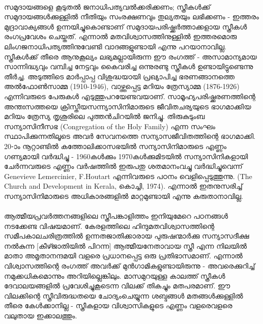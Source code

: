 \label{ch4box2} %
\begin{tcolorbox}[%
 breakable, %
  arc=0mm, 
  left=1pt, right = 1pt, 
  boxrule=0mm,
  colback = {blue!10}, %
] 
\paragraph{}

സമുദായങ്ങളെ കൂടുതൽ ജനാധിപത്യവൽക്കരിക്കണം; സ്ത്രീകൾക്ക് സമുദായങ്ങൾക്കുള്ളിൽ നീതിയും സംരക്ഷണവും തുല്യതയും ലഭിക്കണം - ഇത്തരം മുദ്രാവാക്യങ്ങൾ ഉന്നയിച്ചുകൊണ്ടാണ് സമുദായപരിഷ്ക്കർത്താക്കളായ സ്ത്രീകൾ രംഗപ്രവേശം ചെയ്തത്. എന്നാൽ മതവിശ്വാസത്തിനുള്ളിൽ ഇത്തരമൊരു ലിംഗജനാധിപത്യത്തിനുവേണ്ടി വാദങ്ങളുണ്ടായി എന്നു പറയാനാവില്ല. സ്ത്രീകൾക്ക് തീരെ ആനുകൂല്യം ലഭ്യമല്ലായിരുന്ന ഈ രംഗത്ത് - അസാമാന്യമായ സാന്നിദ്ധ്യവും വമ്പിച്ച നേട്ടവും കൈവരിച്ച ഒന്നുരണ്ടു സ്ത്രീകൾ ഉണ്ടായിട്ടുണ്ടെന്നു തീർച്ച. അടുത്തിടെ മാർപ്പാപ്പ വിശുദ്ധയായി പ്രഖ്യാപിച്ച ഭരണങ്ങാനത്തെ അൽഫോൺസാമ്മ (1910-1946), വാഴ്ത്തപ്പെട്ട മറിയം ത്രേസ്യാമ്മ (1876-1926) എന്നിവരുടെ പേരുകൾ എടുത്തുപറയേണ്ടവയാണ്. സാമൂഹ്യപരിഷ്ക്കരണത്തിന്റെ അന്തഃസത്തയെ ക്രിസ്തീയസന്ന്യാസിനിമാരുടെ ജീവിതചര്യയുടെ ഭാഗമാക്കിയ മറിയം ത്രേസ്യ തൃശൂരിലെ പുത്തൻചിറയിൽ ജനിച്ചു. തിരുകുടുംബ സന്യാസിനീസഭ (Congregation of the Holy Family) എന്ന സംഘം സ്ഥാപിക്കുന്നതിലൂടെ അവർ സേവനത്തെ സന്യാസജീവിതത്തിന്റെ ഭാഗമാക്കി. 20-ാം നൂറ്റാണ്ടിൽ കത്തോലിക്കാസഭയിൽ സന്യാസിനിമാരുടെ എണ്ണം ഗണ്യമായി വർദ്ധിച്ചു - 1960കൾക്കും 1970കൾക്കുമിടയിൽ സന്യാസിനികളായി ചേർന്നവരുടെ എണ്ണം വർഷത്തിൽ ഇരുപതു ശതമാനംവച്ചു വർദ്ധിച്ചുവെന്ന് Genevieve Lemercinier, F.Houtart എന്നിവരുടെ പഠനം വെളിപ്പെടുത്തുന്നു. (The Church and Development in Kerala, കൊച്ചി, 1974). എന്നാൽ ഇതനുസരിച്ച് സന്യാസിനിമാരുടെ അധികാരങ്ങളിൽ മാറ്റമുണ്ടായി എന്നു കരുതാനാവില്ല.

\paragraph{}

ആത്മീയപ്രവർത്തനങ്ങളിലെ സ്ത്രീപങ്കാളിത്തം ഇനിയുമേറെ പഠനങ്ങൾ നടക്കേണ്ട വിഷയമാണ്. കേരളത്തിലെ ഹിന്ദുമതവിശ്വാസത്തിന്റെ സമീപകാലചരിത്രത്തിൽ ഉന്നതജാതിക്കാരായ പുരുഷന്മാർക്കു സന്യാസദീക്ഷ നൽകുന്ന [കീഴ്ജാതിയിൽ പിറന്ന] ആത്മീയനേതാവായ സ്ത്രീ എന്ന നിലയിൽ മാതാ അമൃതാനന്ദമയി വളരെ പ്രധാനപ്പെട്ട ഒരു പ്രതിഭാസമാണ്. എന്നാൽ വിശ്വാസത്തിന്റെ രംഗത്ത് അവർക്ക് മുൻഗാമികളുണ്ടായിരുന്നു - അവരെക്കുറിച്ച് നമുക്കധികമൊന്നും അറിയില്ലെങ്കിലും. മാസമുറയുള്ള കാലത്ത് സ്ത്രീകൾ ദേവാലയങ്ങളിൽ പ്രവേശിച്ചുകൂടെന്ന വിലക്ക് തികച്ചും മതപരമാണ്. ഈ വിലക്കിന്റെ സ്ത്രീവിരുദ്ധതയെ ചോദ്യംചെയ്യുന്ന ശബ്ദങ്ങൾ മതങ്ങൾക്കുള്ളിൽ തീരെ കേൾക്കാനില്ല - സ്ത്രീകളായ വിശ്വാസികളുടെ എണ്ണം വളരെവളരെ വലുതായ ഇക്കാലത്തും.
\end{tcolorbox}


